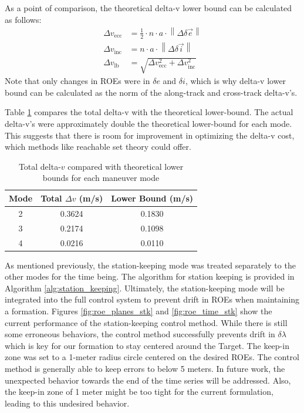 As a point of comparison, the theoretical delta-v lower bound can be calculated as follows:
\begin{align*}
\Delta v_{\text{ecc}} &= \frac{1}{2} \cdot n \cdot a \cdot \left\| \Delta \delta\vec{e} \right\| \\
\Delta v_{\text{inc}} &= n \cdot a \cdot \left\| \Delta \delta\vec{i} \right\| \\
\Delta v_{\text{lb}} &= \sqrt{\Delta v_{\text{ecc}}^2 + \Delta v_{\text{inc}}^2}
\end{align*}
Note that only changes in ROEs were in $\delta e$ and $\delta i$, which is why delta-v lower bound can be calculated as the norm of the along-track and cross-track delta-v's. 

Table \ref{tab:dv_comparison} compares the total delta-v with the theoretical lower-bound. The actual delta-v's were approximately double the theoretical lower-bound for each mode. This suggests that there is room for improvement in optimizing the delta-v cost, which methods like reachable set theory could offer. 
\begin{table}[h!]
\centering
\begin{tabular}{|c|c|c|}
\hline
\textbf{Mode} & \textbf{Total }$\Delta v$ \textbf{(m/s)} & \textbf{Lower Bound (m/s)} \\
\hline
2 & 0.3624 & 0.1830 \\
3 & 0.2174 & 0.1098 \\
4 & 0.0216 & 0.0110 \\
\hline
\end{tabular}
\caption{Total delta-$v$ compared with theoretical lower bounds for each maneuver mode}
\label{tab:dv_comparison}
\end{table}

As mentioned previously, the station-keeping mode was treated separately to the other modes for the time being. The algorithm for station keeping is provided in Algorithm \ref{alg:station_keeping}. Ultimately, the station-keeping mode will be integrated into the full control system to prevent drift in ROEs when maintaining a formation. Figures \ref{fig:roe_planes_stk} and \ref{fig:roe_time_stk} show the current performance of the station-keeping control method. While there is still some erroneous behaviors, the control method successfully prevents drift in $\delta \lambda$ which is key for our formation to stay centered around the Target. The keep-in zone was set to a 1-meter radius circle centered on the desired ROEs. The control method is generally able to keep errors to below 5 meters. In future work, the unexpected behavior towards the end of the time series will be addressed. Also, the keep-in zone of 1 meter might be too tight for the current formulation, leading to this undesired behavior. 

